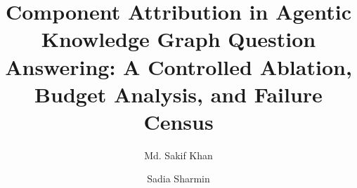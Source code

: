 \documentclass[preprint,review,12pt]{elsarticle}
\begin{document}
\begin{frontmatter}

\title{Component Attribution in Agentic Knowledge Graph Question
  Answering: A Controlled Ablation, Budget Analysis, and Failure Census}

\author[buet]{Md. Sakif Khan}

\author[buet]{Sadia Sharmin}



\begin{abstract}
%


\end{abstract}
\end{frontmatter}
\end{document}
